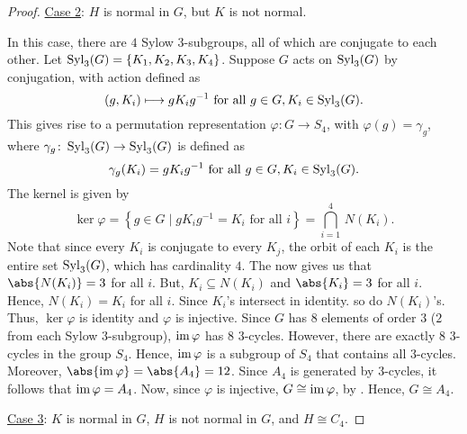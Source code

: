 \begin{proof}
    \underline{Case 2}: $H$ is normal in $G$, but $K$ is not normal. 
    
    In this case, there are $4$ Sylow $3$-subgroups, all of which are conjugate to each other. Let $\operatorname{Syl}_3(G) = \left\{ K_1, K_2, K_3, K_4 \right\}$. Suppose $G$ acts on $\operatorname{Syl}_3(G)$ by conjugation, with action defined as
    \[
        (g, K_i) \longmapsto gK_ig^{-1} \text{ for all } g \in G, K_i \in \operatorname{Syl}_3(G).
    \]
    This gives rise to a permutation representation $\varphi \colon G \to S_4$, with $\varphi(g) = \gamma_g$, where $\gamma_g \colon \operatorname{Syl}_3(G) \to \operatorname{Syl}_3(G)$ is defined as
    \[
        \gamma_g(K_i) = gK_ig^{-1} \text{ for all } g\in G, K_i \in \operatorname{Syl}_3(G). 
    \]
    The kernel is given by
    \[
        \ker\varphi = \left\{ g \in G \mid gK_ig^{-1} = K_i \text{ for all } i \right\} = \bigcap_{i=1}^4 \, N(K_i).
    \]
    Note that since every $K_i$ is conjugate to every $K_j$, the orbit of each $K_i$ is the entire set $\operatorname{Syl}_3(G)$, which has cardinality $4$. The  now gives us that $\abs{N(K_i)} = 3$ for all $i$. But, $K_i \subseteq N(K_i)$ and $\abs{K_i} = 3$ for all $i$. Hence, $N(K_i) = K_i$ for all $i$. Since $K_i$'s intersect in identity. so do $N(K_i)$'s. Thus, $\ker\varphi$ is identity and $\varphi$ is injective. Since $G$ has $8$ elements of order $3$ ($2$ from each Sylow $3$-subgroup), $\operatorname{im}\varphi$ has $8$ $3$-cycles. However, there are exactly $8$ $3$-cycles in the group $S_4$. Hence, $\operatorname{im}\varphi$ is a subgroup of $S_4$ that contains all $3$-cycles. Moreover, $\abs{\im\varphi} = \abs{A_4} = 12$. Since $A_4$ is generated by $3$-cycles, it follows that $\operatorname{im}\varphi = A_4$. Now, since $\varphi$ is injective, $G \cong \operatorname{im}\varphi$, by . Hence, $G \cong A_4$.
    
    \underline{Case 3}: $K$ is normal in $G$, $H$ is not normal in $G$, and $H \cong C_4$. 
    

\end{proof}

